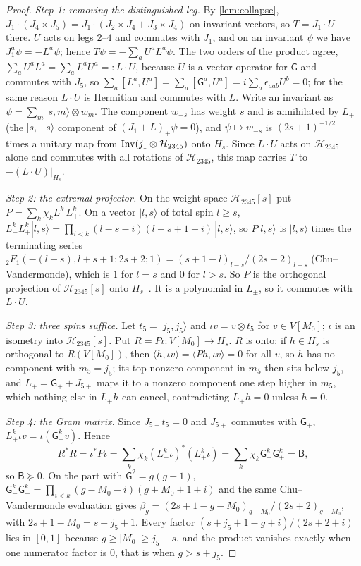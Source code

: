 \begin{proof}
\emph{Step 1: removing the distinguished leg.} By \cref{lem:collapse},
$J_1\cdot(J_4\times J_5)=J_1\cdot(J_2\times J_4+J_3\times J_4)$ on invariant vectors, so
$T=J_1\cdot U$ there. $U$ acts on legs $2$--$4$ and commutes with $J_1$, and on an
invariant $\psi$ we have $J_1^a\psi=-L^a\psi$; hence $T\psi=-\sum_aU^aL^a\psi$. The two
orders of the product agree, $\sum_aU^aL^a=\sum_aL^aU^a=:L\cdot U$, because $U$ is a vector
operator for $\mathsf G$ and commutes with $J_5$, so
$\sum_a[L^a,U^a]=\sum_a[\mathsf G^a,U^a]=i\sum_a\epsilon_{aab}U^b=0$; for the same reason
$L\cdot U$ is Hermitian and commutes with $L$. Write an invariant as
$\psi=\sum_m|s,m\rangle\otimes w_m$. The component $w_{-s}$ has weight $s$ and is
annihilated by $L_+$ (the $|s,-s\rangle$ component of $(J_1+L)_+\psi=0$), and
$\psi\mapsto w_{-s}$ is $(2s+1)^{-1/2}$ times a unitary map from
$\operatorname{Inv}(j_1\otimes\mathcal H_{2345})$ onto $H_s$. Since $L\cdot U$ acts on $\mathcal H_{2345}$ alone and
commutes with all rotations of $\mathcal H_{2345}$, this map carries $T$ to $-(L\cdot U)|_{H_s}$.

\emph{Step 2: the extremal projector.} On the weight space $\mathcal H_{2345}[s]$ put
$P=\sum_k\chi_kL_-^kL_+^k$. On a vector $|l,s\rangle$ of total spin $l\ge s$,
$L_-^kL_+^k|l,s\rangle=\prod_{i<k}(l-s-i)(l+s+1+i)\,|l,s\rangle$, so $P|l,s\rangle$ is
$|l,s\rangle$ times the terminating series
${}_2F_1(-(l-s),l+s+1;2s+2;1)=(s+1-l)_{l-s}/(2s+2)_{l-s}$ (Chu--Vandermonde), which is
$1$ for $l=s$ and $0$ for $l>s$. So $P$ is the orthogonal projection of $\mathcal H_{2345}[s]$
onto $H_s$~\cite{AST1971}. It is a polynomial in $L_\pm$, so it commutes with $L\cdot U$.

\emph{Step 3: three spins suffice.} Let $t_5=|j_5,j_5\rangle$ and
$\iota v=v\otimes t_5$ for $v\in V[M_0]$; $\iota$ is an isometry into $\mathcal H_{2345}[s]$.
Put $R=P\iota:V[M_0]\to H_s$. $R$ is onto: if $h\in H_s$ is orthogonal to $R(V[M_0])$,
then $\langle h,\iota v\rangle=\langle Ph,\iota v\rangle=0$ for all $v$, so $h$ has no
component with $m_5=j_5$; its top nonzero component in $m_5$ then sits below $j_5$, and
$L_+=\mathsf G_++J_{5+}$ maps it to a nonzero component one step higher in $m_5$, which
nothing else in $L_+h$ can cancel, contradicting $L_+h=0$ unless $h=0$.

\emph{Step 4: the Gram matrix.} Since $J_{5+}t_5=0$ and $J_{5+}$ commutes with
$\mathsf G_+$, $L_+^k\iota v=\iota(\mathsf G_+^kv)$. Hence
\[
  R^*R=\iota^*P\iota=\sum_k\chi_k(L_+^k\iota)^*(L_+^k\iota)
  =\sum_k\chi_k\mathsf G_-^k\mathsf G_+^k=\mathsf B,
\]
so $\mathsf B\succeq0$. On the part with $\mathsf G^2=g(g+1)$,
$\mathsf G_-^k\mathsf G_+^k=\prod_{i<k}(g-M_0-i)(g+M_0+1+i)$ and the same Chu--Vandermonde
evaluation gives $\beta_g=(2s+1-g-M_0)_{g-M_0}/(2s+2)_{g-M_0}$, with
$2s+1-M_0=s+j_5+1$. Every factor $(s+j_5+1-g+i)/(2s+2+i)$ lies in $[0,1]$ because
$g\ge|M_0|\ge j_5-s$, and the product vanishes exactly when one numerator factor is
$0$, that is when $g>s+j_5$.


\end{proof}
